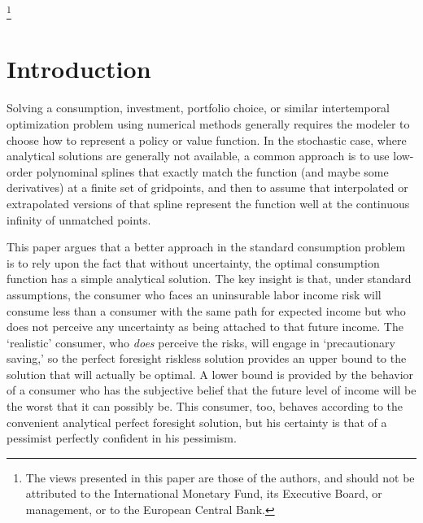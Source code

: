 \documentclass[titlepage,abstract]{\econtex}
\begin{document}
\begin{authorsinfo}
\end{authorsinfo}

\thanks{The views presented in this paper are those of the authors, and should not be attributed to the International Monetary Fund, its Executive Board, or management, or to the European Central Bank.}

\thispagestyle{empty}


\pagebreak\newpage


\renewcommand{\DiscAlt}{\beta} %

\hypertarget{Introduction}{}
\section{Introduction}\label{sec:Intro}

Solving a consumption, investment, portfolio choice, or similar
intertemporal optimization problem using numerical methods generally
requires the modeler to choose how to represent a policy or value
function.  In the stochastic case, where analytical solutions are
generally not available, a common approach is to use low-order
polynominal splines that exactly match the function (and maybe some
derivatives) at a finite set of gridpoints, and then to assume that
interpolated or extrapolated versions of that 
spline represent the function well at the continuous infinity of unmatched points.

This paper argues that a better approach in the standard consumption 
problem is to rely upon the fact that without uncertainty, the optimal consumption
function has a simple analytical solution.  The key insight is that,
under standard assumptions, the consumer who faces an uninsurable
labor income risk will consume less than a consumer with the same path
for expected income but who does not perceive any uncertainty as being
attached to that future income.  The `realistic' consumer, who \textit{
  does} perceive the risks, will engage in `precautionary saving,' so
the perfect foresight riskless solution provides an upper bound to the
solution that will actually be optimal.  A lower bound is provided by
the behavior of a consumer who has the subjective belief that the
future level of income will be the worst that it can possibly be.
This consumer, too, behaves according to the convenient analytical perfect
foresight solution, but his certainty is that of a pessimist 
perfectly confident in his pessimism.
\end{document}
